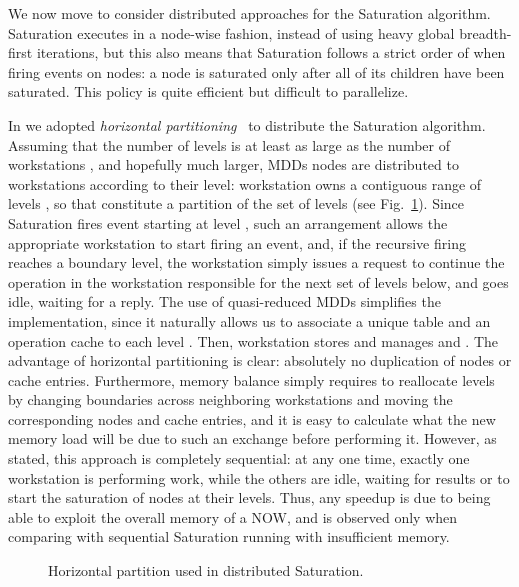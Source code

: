 \documentclass[copyright,creativecommons]{eptcs}
\newcommand{\CENTERPSSCALE}[2]{\begin{center}\mbox{\epsfig{file=#1.eps, scale=#2}}\end{center}}
\begin{document}
We now move to consider distributed approaches for the Saturation algorithm.
Saturation executes in a node-wise fashion, instead of
using heavy global breadth-first iterations, but this also means that
Saturation follows a strict order of when firing events on nodes:
a node is saturated only after all of its children have been saturated.
This policy is quite efficient but difficult to parallelize.

In \cite{2004QEST-Distributed} we adopted
\emph{horizontal partitioning}~\cite{Ranjan1996}
to distribute the Saturation algorithm.
Assuming that the number of levels  is at least as large as the number
of workstations , and hopefully much larger,
MDDs nodes are distributed to workstations according to their level:
workstation  owns a contiguous range of levels
, so that
 constitute a partition of the set of levels
 (see Fig.~\ref{FIG:pardis-hor-partition}).
Since Saturation fires event  starting at level ,
such an arrangement allows the appropriate workstation to start firing an
event, and, if the recursive firing reaches a boundary level,
the workstation simply issues a request to continue the operation in
the workstation responsible for the next set of levels below, and
goes idle, waiting for a reply.
The use of quasi-reduced \cite{Kimura1990} MDDs simplifies the implementation,
since it naturally allows us to associate a unique table 
and an operation cache  to each level .
Then, workstation  stores and manages 
and .
The advantage of horizontal partitioning is clear:
absolutely no duplication of nodes or cache entries.
Furthermore, memory balance simply requires to reallocate levels by changing
boundaries across neighboring workstations and moving the
corresponding nodes and cache entries, and it is easy to calculate what
the new memory load will be due to such an exchange before performing it.
However, as stated, this approach is completely sequential: at any one time,
exactly one workstation is performing work, while the
others are idle, waiting for results or to start the saturation of
nodes at their levels.
Thus, any speedup is due to being able to exploit
the overall memory of a NOW, and is observed only when comparing with
sequential Saturation running with insufficient memory.


\begin{figure}
\begin{center}
\CENTERPSSCALE{pardis-hor-partition}{0.74}
\end{center}
\caption{Horizontal partition used in distributed Saturation.}
\label{FIG:pardis-hor-partition}
\end{figure}
\end{document}
